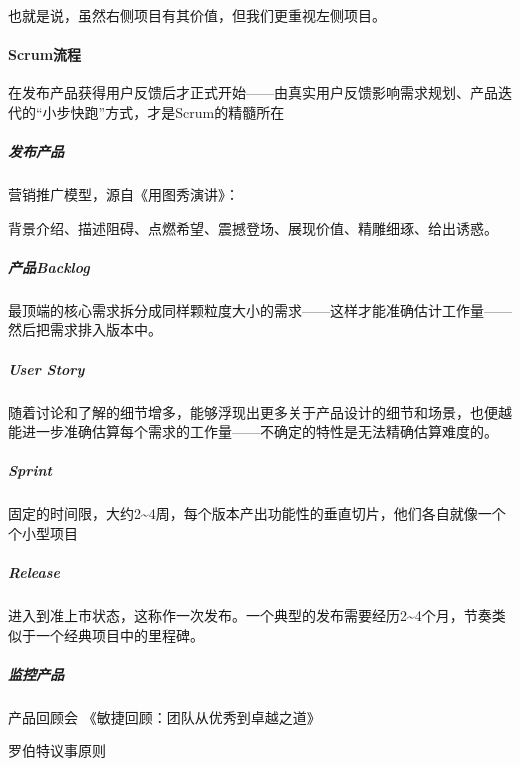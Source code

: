 \documentclass[letterpaper,11pt,english]{sphinxmanual}
\begin{document}
也就是说，虽然右侧项目有其价值，但我们更重视左侧项目。
%
\begin{footnote}[737]\sphinxAtStartFootnote
{}
%
\end{footnote}


\paragraph{Scrum流程}
\label{\detokenize{chapter_project/Scrum:id4}}
在发布产品获得用户反馈后才正式开始——由真实用户反馈影响需求规划、产品迭代的“小步快跑”方式，才是Scrum的精髓所在


\subparagraph{发布产品}
\label{\detokenize{chapter_project/Scrum:id5}}
营销推广模型，源自《用图秀演讲》：

背景介绍、描述阻碍、点燃希望、震撼登场、展现价值、精雕细琢、给出诱惑。
%
\begin{footnote}[738]\sphinxAtStartFootnote
{}
%
\end{footnote}


\subparagraph{产品Backlog}
\label{\detokenize{chapter_project/Scrum:backlog}}
最顶端的核心需求拆分成同样颗粒度大小的需求——这样才能准确估计工作量——然后把需求排入版本中。


\subparagraph{User Story}
\label{\detokenize{chapter_project/Scrum:user-story}}
随着讨论和了解的细节增多，能够浮现出更多关于产品设计的细节和场景，也便越能进一步准确估算每个需求的工作量——不确定的特性是无法精确估算难度的。


\subparagraph{Sprint}
\label{\detokenize{chapter_project/Scrum:sprint}}
固定的时间限，大约2\textasciitilde{}4周，每个版本产出功能性的垂直切片，他们各自就像一个个小型项目


\subparagraph{Release}
\label{\detokenize{chapter_project/Scrum:release}}
进入到准上市状态，这称作一次发布。一个典型的发布需要经历2\textasciitilde{}4个月，节奏类似于一个经典项目中的里程碑。


\subparagraph{监控产品}
\label{\detokenize{chapter_project/Scrum:id6}}
产品回顾会 《敏捷回顾：团队从优秀到卓越之道》

罗伯特议事原则
\end{document}

